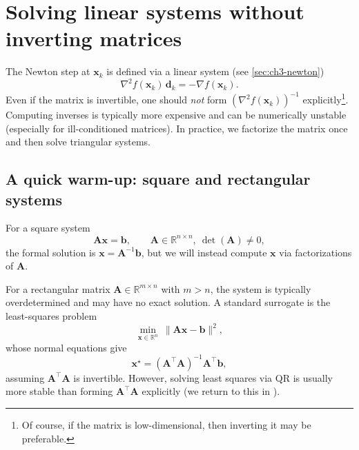 \section{Solving linear systems without inverting matrices}
\label{sec:ch3-linear-systems}
The Newton step at $\mathbf{x}_k$ is defined via a linear system (see
\cref{sec:ch3-newton})
\[
  \nabla^2 f(\mathbf{x}_k)\,\mathbf{d}_k = -\nabla f(\mathbf{x}_k).
\]
Even if the matrix is invertible, one should \emph{not} form
$(\nabla^2 f(\mathbf{x}_k))^{-1}$ explicitly\footnote{Of course, if the matrix
is low-dimensional, then inverting it may be preferable.}. Computing inverses is typically
more expensive and can be numerically unstable (especially for ill-conditioned
matrices). In practice, we factorize the matrix once and then solve triangular
systems.

\subsection{A quick warm-up: square and rectangular systems}
For a square system
\[
  \mathbf{A}\mathbf{x}=\mathbf{b},\qquad \mathbf{A}\in\mathbb{R}^{n\times n},\ \det(\mathbf{A})\neq 0,
\]
the formal solution is $\mathbf{x}=\mathbf{A}^{-1}\mathbf{b}$, but we will
instead compute $\mathbf{x}$ via factorizations of $\mathbf{A}$.

For a rectangular matrix $\mathbf{A}\in\mathbb{R}^{m\times n}$ with $m>n$, the
system is typically overdetermined and may have no exact solution. A standard
surrogate is the least-squares problem
\[
  \min_{\mathbf{x}\in\mathbb{R}^n}\ \|\mathbf{A}\mathbf{x}-\mathbf{b}\|^2,
\]
whose normal equations give
\[
  \mathbf{x}^\star = (\mathbf{A}^\top \mathbf{A})^{-1}\mathbf{A}^\top \mathbf{b},
\]
assuming $\mathbf{A}^\top\mathbf{A}$ is invertible. However, solving least
squares via QR is usually more stable than forming $\mathbf{A}^\top\mathbf{A}$
explicitly (we return to this in ).

